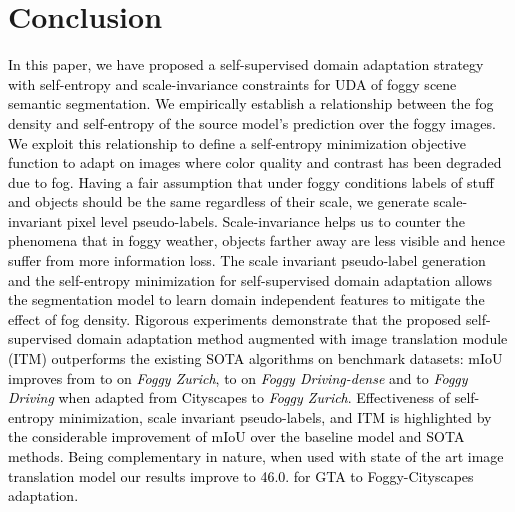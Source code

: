\documentclass[final,5p,times,twocolumn]{elsarticle}
\begin{document}
\section{Conclusion}
\label{sec:Conclusion}
\textcolor{black}{
In this paper, we have proposed a self-supervised domain adaptation strategy with self-entropy and scale-invariance constraints for UDA of foggy scene semantic segmentation. 
We empirically establish a relationship between the fog density and self-entropy of the source model's prediction over the foggy images. We exploit this relationship to define a self-entropy minimization objective function to  adapt on images where color quality and contrast has been degraded due to fog. 
Having a fair assumption that under foggy conditions labels of stuff and objects should be the same regardless of their scale, we generate scale-invariant pixel level pseudo-labels.
Scale-invariance helps us to counter the phenomena that in foggy weather, objects farther away are less visible and hence suffer from more information loss. The scale invariant pseudo-label generation and the self-entropy minimization for self-supervised domain adaptation allows the segmentation model to learn domain independent features to mitigate the effect of fog density.
Rigorous experiments demonstrate that the proposed self-supervised domain adaptation method augmented with image translation module (ITM) outperforms the existing SOTA algorithms on benchmark datasets: mIoU improves from  to  on \textit{Foggy Zurich},  to  on \textit{Foggy Driving-dense } and  to  \textit{Foggy Driving} when adapted from Cityscapes to \textit{Foggy Zurich}. Effectiveness of self-entropy minimization, scale invariant pseudo-labels, and ITM is highlighted by the considerable improvement of mIoU over the baseline model and SOTA methods. 
\textcolor{black}{Being complementary in nature, when used with state of the art image translation model our results improve to 46.0. for GTA to Foggy-Cityscapes adaptation.}}











\end{document}
